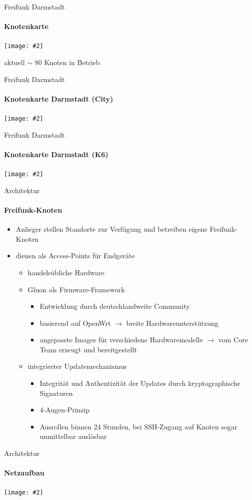 \documentclass{beamer}
\newcommand{\centeredimage}[2][ ]{
        \begin{center}
            \texttt{[image: \#2]} $\;$

            \tiny{#1}
        \end{center}
}
\begin{document}
\begin{frame}{Freifunk Darmstadt}
\framesubtitle{Knotenkarte}
\centeredimage[aktuell $\sim$ 80 Knoten in Betrieb]{images/ffmap_darmstadt}
\end{frame}

\begin{frame}{Freifunk Darmstadt}
\framesubtitle{Knotenkarte Darmstadt (City)}
\centeredimage{images/ffmap_darmstadt_city}
\end{frame}

\begin{frame}{Freifunk Darmstadt}
\framesubtitle{Knotenkarte Darmstadt (K6)}
\centeredimage{images/ffmap_darmstadt_k6}
\end{frame}


\begin{frame}{Architektur}
\framesubtitle{Freifunk-Knoten}
\begin{itemize}
	\item Anlieger stellen Standorte zur Verfügung und betreiben eigene Freifunk-Knoten
	\item dienen als Access-Points für Endgeräte
	\begin{itemize}
		\item handelsübliche Hardware
		\item Gluon als Firmware-Framework
		\begin{itemize}
			\item Entwicklung durch deutschlandweite Community
			\item basierend auf OpenWrt $\rightarrow$ breite Hardwareunterstützung
			\item angepasste Images für verschiedene Hardwaremodelle \newline $\rightarrow$ vom Core Team erzeugt und bereitgestellt
		\end{itemize}
		\item integrierter Updatemechanismus
		\begin{itemize}
			\item Integrität und Authentizität der Updates durch kryptographische Signaturen
			\item 4-Augen-Prinzip
			\item Ausrollen binnen 24 Stunden, bei SSH-Zugang auf Knoten sogar unmittelbar auslösbar
		\end{itemize}
	\end{itemize}
\end{itemize}
\end{frame}


\begin{frame}{Architektur}
\framesubtitle{Netzaufbau}
\centeredimage{images/network_layout}
\end{frame}
\end{document}
